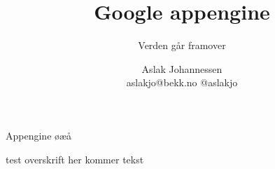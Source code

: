 \documentclass[norsk]{beamer}
\author{Aslak Johannessen \\ aslakjo@bekk.no  @aslakjo}
\title[Appengine]{Google appengine}
\subtitle[]{Verden går framover}
\institute{BEKK Consulting AS}
\begin{document}
\maketitle

\begin{frame}
  Appengine øæå
\end{frame}

\begin{frame}{test overskrift}
 her kommer tekst
\end{frame}
\end{document}
